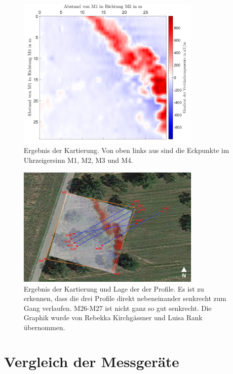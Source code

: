 \begin{figure}[!ht]
 \centering
 \includegraphics[width=0.8\textwidth]{fig/kartierung_verschwommen.png}
 \caption[Ergebnis der Kartierung]{Ergebnis der Kartierung. Von oben links aus sind die Eckpunkte im Uhrzeigersinn M1, M2, M3 und M4.}
 \label{fig:Kartierung}
\end{figure}

\begin{figure}[!ht]
 \centering
 \includegraphics[width=0.8\textwidth]{fig/MagnetikGesamtueberblick}
 \caption[Ergebnis der Kartierung und Lage der der Profile]{Ergebnis der Kartierung und Lage der der Profile. Es ist zu erkennen, dass die drei Profile direkt nebeneinander senkrecht zum Gang verlaufen. M26-M27 ist nicht ganz so gut senkrecht. Die Graphik wurde von Rebekka Kirchgässner und Luisa Rank übernommen.}
 \label{fig:MagnetikGesamtueberblick}
\end{figure}

\section{Vergleich der Messgeräte}

